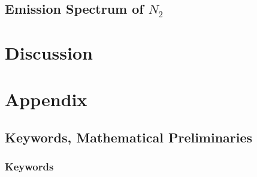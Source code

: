 \documentclass{article}
\begin{document}
\subsection{Emission Spectrum of $N_2$}
\section{Discussion}
\newpage
\section{Appendix}

\subsection{Keywords, Mathematical Preliminaries}
\subsubsection{Keywords}
\end{document}

